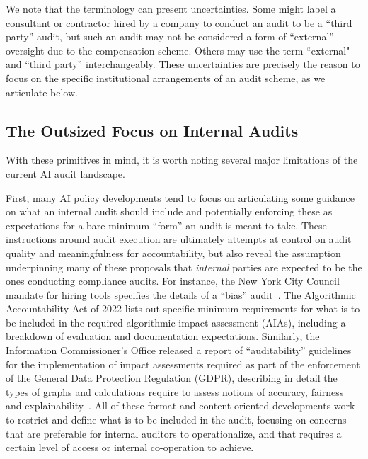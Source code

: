 \documentclass[sigconf]{acmart}
\begin{document}
We note that the terminology can present uncertainties.
Some might label a consultant or contractor hired by a company to conduct an audit to be a ``third party'' audit, but such an audit may not be considered a form of ``external'' oversight due to the compensation scheme. Others may use the term ``external" and ``third party'' interchangeably. These uncertainties are precisely the reason to focus on the specific institutional arrangements of an audit scheme, as we articulate below. 

\vspace{-3mm}
\subsection{The Outsized Focus on Internal Audits}

With these primitives in mind, it is worth noting several major limitations of the current AI audit landscape. 

First, many AI policy developments tend to focus on 
articulating some guidance on what an internal audit should include and potentially enforcing these as expectations for a bare minimum “form” an audit is meant to take. 
These instructions around audit execution are ultimately attempts at control on audit quality and meaningfulness for accountability, but also reveal the assumption underpinning many of these proposals that \emph{internal} parties are expected to be the ones conducting compliance audits. 
For instance, the New York City Council mandate for hiring tools specifies the details of a “bias” audit~\cite{maurernew2021}. The Algorithmic Accountability Act of 2022 lists out specific minimum requirements for what is to be included in the required algorithmic impact assessment (AIAs), including a breakdown of evaluation and documentation expectations. Similarly, the Information Commissioner's Office released a report of “auditability” guidelines for the implementation of impact assessments required as part of the enforcement of the General Data Protection Regulation (GDPR), describing in detail the types of graphs and calculations require to assess notions of accuracy, fairness and explainability~\cite{noauthorai2020}. All of these format and content oriented developments work to restrict and define what is to be included in the audit, focusing on concerns that are preferable for internal auditors to operationalize, and that requires a certain level of access or internal co-operation to achieve. 
\end{document}
